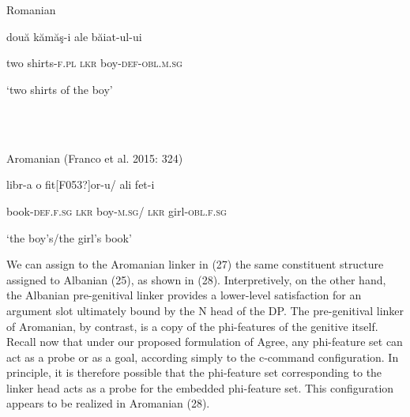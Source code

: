 \documentclass[output=paper]{langsci/langscibook}
\begin{document}
\begin{styleSfondomedioiColorexi}
\ea%
    \label{ex:key:26}
    \gll\\
        \\
    \glt
    \z

           Romanian
\end{styleSfondomedioiColorexi}

\begin{styleSfondomedioiColorexi}
două   kămăş-i   ale   băiat-ul-ui     
\end{styleSfondomedioiColorexi}

\begin{styleSfondomedioiColorexi}
  two   shirts-\textsc{f.pl}  \textsc{lkr}  boy-\textsc{def-obl.m.sg}   
\end{styleSfondomedioiColorexi}

\begin{styleSfondomedioiColorexi}
  ‘two shirts of the boy’ 
\end{styleSfondomedioiColorexi}

\begin{styleparagrafo}
\ea%
    \label{ex:key:27}
    \gll\\
        \\
    \glt
    \z

          Aromanian (Franco et al. 2015: 324) 
\end{styleparagrafo}

\begin{styleparagrafo}
libr-a       o   fit[F053?]or-u/  ali   fet-i     
\end{styleparagrafo}

\begin{styleparagrafo}
book-\textsc{def.f.sg}   \textsc{lkr}  boy\textsc{{}-m.sg}/   \textsc{lkr}  girl-\textsc{obl.f.sg}   
\end{styleparagrafo}

\begin{styleparagrafo}
‘the boy’s/the girl’s book’
\end{styleparagrafo}

\begin{styleSfondomedioiColorexi}
We can assign to the Aromanian linker in (27) the same constituent structure assigned to Albanian (25), as shown in (28). Interpretively, on the other hand, the Albanian pre-genitival linker provides a lower-level satisfaction for an argument slot ultimately bound by the N head of the DP. The pre-genitival linker of Aromanian, by contrast, is a copy of the phi-features of the genitive itself. Recall now that under our proposed formulation of Agree, any phi-feature set can act as a probe or as a goal, according simply to the c-command configuration. In principle, it is therefore possible that the phi-feature set corresponding to the linker head acts as a probe for the embedded phi-feature set. This configuration appears to be realized in Aromanian (28).
\end{styleSfondomedioiColorexi}
\end{document}
